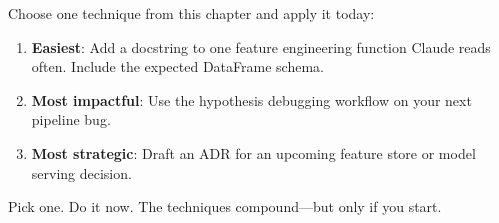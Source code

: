 

\begin{trybox}
Choose one technique from this chapter and apply it today:
\begin{enumerate}
  \item \textbf{Easiest}: Add a docstring to one feature engineering function
    Claude reads often. Include the expected DataFrame schema.
  \item \textbf{Most impactful}: Use the hypothesis debugging workflow
    on your next pipeline bug.
  \item \textbf{Most strategic}: Draft an ADR for an upcoming
    feature store or model serving decision.
\end{enumerate}
Pick one. Do it now. The techniques compound---but only if you start.
\end{trybox}
